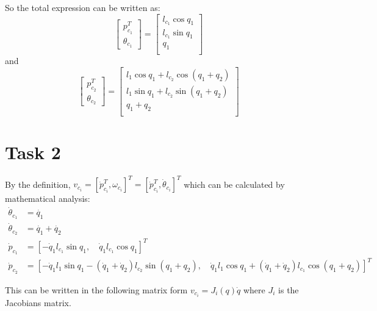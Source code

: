 \documentclass[a4paper,12pt,oneside,onecolumn]{article} %
\begin{document}
So the total expression can be written as:
\begin{equation}
    \begin{bmatrix}
    p_{c_1}^T \\ \theta_{c_1}
    \end{bmatrix} = 
    \begin{bmatrix}
    l_{c_1}  \cos{q_1} \\ l_{c_1}  \sin{q_1} \\ q_1 \\
    \end{bmatrix}
\end{equation}
and
\begin{equation}
    \begin{bmatrix}
    p_{c_2}^T \\ \theta_{c_2}
    \end{bmatrix} = 
    \begin{bmatrix}
    l_1  \cos{q_1} + l_{c_2}   \cos{(q_1+q_2)} \\ l_1  \sin{q_1} +  l_{c_2}   \sin{(q_1+q_2)} \\ q_1 + q_2 \\
    \end{bmatrix}
\end{equation}


\section*{Task 2}
By the definition, $v_{c_i} = [\dot{p}^T_{c_i}, \omega_{c_i}]^T =[\dot{p}^T_{c_i}, \dot{\theta}_{c_i}]^T$ which can be calculated by mathematical analysis: 
\begin{equation}
    \begin{aligned}
        \dot{\theta}_{c_1} & = \dot{q_1} \\ \dot{\theta}_{c_2} & = \dot{q_1} + \dot{q_2} \\
        \dot{p}_{c_1} & = [-\dot{q}_1 l_{c_1}  \sin{q_1}, \quad \dot{q}_1 l_{c_1}  \cos{q_1}]^T \\
        \dot{p}_{c_2} & = [-\dot{q}_1 l_1  \sin{q_1} - (\dot{q}_1+\dot{q}_2) l_{c_2}   \sin{(q_1+q_2)}, \quad \dot{q}_1 l_1 \cos{q_1} +  (\dot{q}_1+\dot{q}_2) l_{c_1}  \cos{(q_1+q_2)}]^T 
    \end{aligned}
\end{equation}

This can be written in the following matrix form $v_{c_i} = J_i(q) \dot{q}$ where $J_i$ is the Jacobians matrix. 
\end{document}
